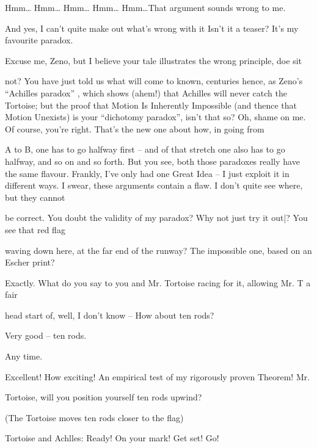 \achilles Hmm… Hmm… Hmm… Hmm… Hmm…That argument sounds wrong to me.\par
And yes, I can’t quite make out what’s wrong with it 
\zeno Isn’t it a teaser? It’s my favourite paradox.\par

\tortoise Excuse me, Zeno, but I believe your tale illustrates the wrong principle, doe sit\par
not? You have just told us what will come to known, centuries hence, as Zeno’s “Achilles paradox” , which shows (ahem!) that Achilles will never catch the Tortoise; but the proof that Motion Is Inherently Impossible (and thence that Motion Unexists) is your “dichotomy paradox”, isn’t that so? 
\zeno Oh, shame on me. Of course, you’re right. That’s the new one about how, in going from\par
A to B, one has to go halfway first – and of that stretch one also has to go halfway, and so on and so forth. But you see, both those paradoxes really have the same flavour. Frankly, I’ve only had one Great Idea – I just exploit it in different ways. 
\achilles I swear, these arguments contain a flaw. I don’t quite see where, but they cannot\par
be correct. 
\zeno You doubt the validity of my paradox? Why not just try it out|? You see that red flag\par
waving down here, at the far end of the runway? 
\achilles The impossible one, based on an Escher print?\par

\zeno Exactly. What do you say to you and Mr. Tortoise racing for it, allowing Mr. T a fair\par
head start of, well, I don’t know – 
\tortoise How about ten rods?\par

\zeno Very good – ten rods.\par

\achilles Any time.\par

\zeno Excellent! How exciting! An empirical test of my rigorously proven Theorem! Mr.\par
Tortoise, will you position yourself ten rods upwind? 


\intro (The Tortoise moves ten rods closer to the flag) \endintro


Tortoise and Achlles: Ready! 
\zeno On your mark! Get set! Go!\par









